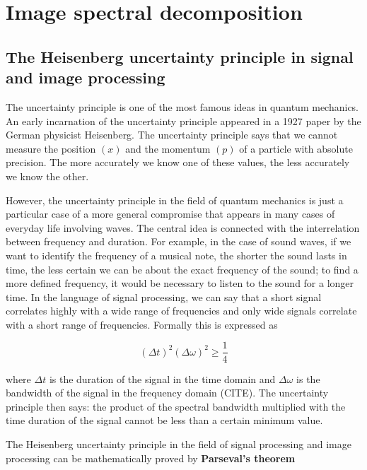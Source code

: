 

\chapter{Image spectral decomposition}



\section{The Heisenberg uncertainty principle in signal and image
processing}\label{the-heisenberg-uncertainty-principle-in-signal-and-image-processing}

The uncertainty principle is one of the most famous ideas in quantum mechanics. An early incarnation of the uncertainty principle appeared in a 1927 paper by the German physicist Heisenberg. The uncertainty principle says that we cannot measure the position $(x)$ and the momentum $(p)$ of a particle with absolute precision. The more accurately we know one of these values, the less accurately we know the other. 

However, the uncertainty principle in the field of quantum mechanics is just a particular case of a more general compromise that appears in many cases of everyday life involving waves. The central idea is connected with the interrelation between frequency and duration. For example, in the case of sound waves, if we want to identify the frequency of a musical note, the shorter the sound lasts in time, the less certain we can be about the exact frequency of the sound; to find a more defined frequency, it would be necessary to listen to the sound for a longer time. In the language of signal processing, we can say that a short signal correlates highly with a wide range of frequencies and only wide signals correlate with a short range of frequencies. Formally this is expressed as

\begin{equation}
	(\Delta t)^2(\Delta \omega)^2 \geq \frac{1}{4}
\end{equation}

where $\Delta t$ is the duration of the signal in the time domain and $\Delta \omega$ is the bandwidth of the signal in the frequency domain (CITE). The uncertainty principle then says: the product of the spectral bandwidth multiplied with the time duration of the signal cannot be less than a certain minimum value.


The Heisenberg uncertainty principle in the field of signal processing and image processing can be mathematically proved by \textbf{Parseval's theorem}

